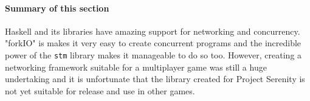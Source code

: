 \paragraph{Summary of this section} Haskell and its libraries have amazing support for
networking and concurrency. "forkIO" is makes it very easy to create concurrent programs
and the incredible power of the \texttt{stm} library makes it manageable to do so too.
However, creating a networking framework suitable for a multiplayer game was still a huge
undertaking and it is unfortunate that the library created for Project Serenity is not
yet suitable for release and use in other games.
